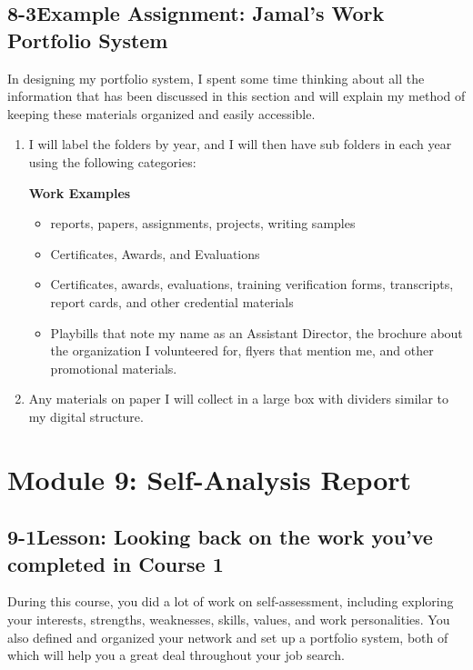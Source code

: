 \pagebreak \subsection*{8-3\quad Example Assignment: Jamal's Work Portfolio System}
In designing my portfolio system, I spent some time thinking about all the information that has been discussed in this section and will explain my method of keeping these materials organized and easily accessible.
\begin{enumerate}[leftmargin=*]
\item  I will label the folders by year, and I will then have sub folders in each year using the following categories:

\textbf{Work Examples}
\begin{itemize}
\item reports, papers, assignments, projects, writing samples
\item Certificates, Awards, and Evaluations
\item Certificates, awards, evaluations, training verification forms, transcripts, report cards, and other credential materials
\item Playbills that note my name as an Assistant Director, the brochure about the organization I volunteered for, flyers that mention me, and other promotional materials.
\end{itemize}
\item Any materials on paper I will collect in a large box with dividers similar to my digital structure.
 \end{enumerate}
\pagebreak \section*{Module 9:	Self-Analysis Report}
\noindent\makebox[\textwidth]{\rule{\linewidth}{0.4pt}} 
\localtableofcontents 
\noindent\makebox[\textwidth]{\rule{\linewidth}{0.4pt}} 


\pagebreak \subsection*{9-1\quad Lesson: Looking back on the work you've completed in Course 1}
During this course, you did a lot of work on self-assessment, including exploring your interests, strengths, weaknesses, skills, values, and work personalities. You also defined and organized your network and set up a portfolio system, both of which will help you a great deal throughout your job search.

